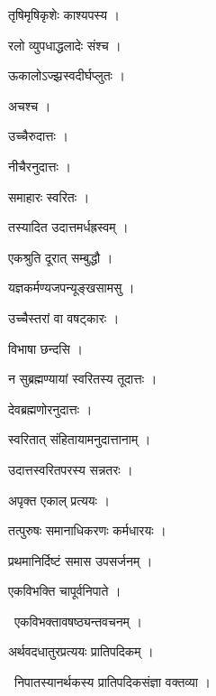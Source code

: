 \documentclass[10pt, openany, oneside]{book}
\begin{document}
\noindent तृषिमृषिकृशेः काश्यपस्य ।

\noindent रलो व्युपधाद्धलादेः संश्च ।

\noindent ऊकालोऽज्झ्रस्वदीर्घप्लुतः ।

\noindent अचश्च ।

\noindent उच्चैरुदात्तः ।

\noindent नीचैरनुदात्तः ।

\noindent समाहारः स्वरितः ।

\noindent तस्यादित उदात्तमर्धह्रस्वम् ।

\noindent एकश्रुति दूरात् सम्बुद्धौ ।

\noindent यज्ञकर्मण्यजपन्यूङ्खसामसु ।

\noindent उच्चैस्तरां वा वषट्कारः ।

\noindent विभाषा छन्दसि ।

\noindent न सुब्रह्मण्यायां स्वरितस्य तूदात्तः ।

\noindent देवब्रह्मणोरनुदात्तः ।

\noindent स्वरितात् संहितायामनुदात्तानाम् ।

\noindent उदात्तस्वरितपरस्य सन्नतरः ।

\noindent अपृक्त एकाल् प्रत्ययः ।

\noindent तत्पुरुषः समानाधिकरणः कर्मधारयः ।

\noindent प्रथमानिर्दिष्टं समास उपसर्जनम् ।

\noindent एकविभक्ति चापूर्वनिपाते ।

\par\noindent\hspace{1.5em}{\vps वा॰}~{\qt एकविभक्तावषष्ठ्यन्तवचनम् ।}

\noindent अर्थवदधातुरप्रत्ययः प्रातिपदिकम् ।

\par\noindent\hspace{1.5em}{\vps वा॰}~{\qt निपातस्यानर्थकस्य प्रातिपदिकसंज्ञा वक्तव्या ।}
\end{document}
